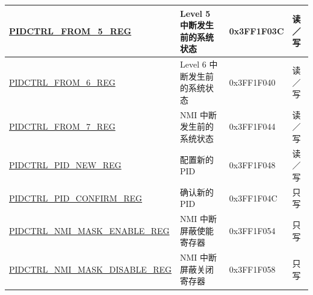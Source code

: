 \begin{longtable}{ | p{5.8cm} | p{5.5cm} | p{2.2cm} | p{1.5cm} | }
\hyperref[regdesc:PIDCTRLFROMnREG]{PIDCTRL\_FROM\_5\_REG} & Level 5 中断发生前的系统状态 & 0x3FF1F03C & 读／写 \\ \hline
\hyperref[regdesc:PIDCTRLFROMnREG]{PIDCTRL\_FROM\_6\_REG} & Level 6 中断发生前的系统状态 & 0x3FF1F040 & 读／写 \\ \hline
\hyperref[regdesc:PIDCTRLFROMnREG]{PIDCTRL\_FROM\_7\_REG} & NMI 中断发生前的系统状态 & 0x3FF1F044 & 读／写 \\ \hline
\hyperref[regdesc:PIDCTRLPIDNEWREG]{PIDCTRL\_PID\_NEW\_REG} & 配置新的 PID & 0x3FF1F048 & 读／写 \\ \hline
\hyperref[regdesc:PIDCTRLPIDCONFIRMREG]{PIDCTRL\_PID\_CONFIRM\_REG} & 确认新的 PID & 0x3FF1F04C & 只写 \\ \hline
\hyperref[regdesc:PIDCTRLNMIMASKENABLEREG]{PIDCTRL\_NMI\_MASK\_ENABLE\_REG} & NMI 中断屏蔽使能寄存器 & 0x3FF1F054 & 只写 \\ \hline
\hyperref[regdesc:PIDCTRLNMIMASKDISABLEREG]{PIDCTRL\_NMI\_MASK\_DISABLE\_REG} & NMI 中断屏蔽关闭寄存器 & 0x3FF1F058 & 只写 \\ \hline
\end{longtable}
